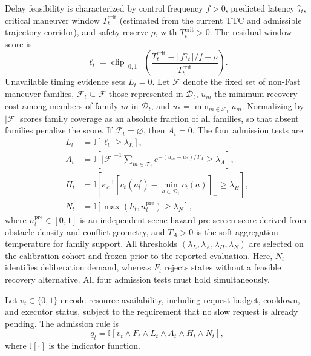 \documentclass[letterpaper,journal]{IEEEtran}
\begin{document}
Delay feasibility is characterized by control frequency $f>0$, predicted latency
$\widehat\tau_t$, critical maneuver window $T_t^{\mathrm{crit}}$ (estimated
from the current TTC and admissible trajectory corridor), and safety reserve
$\rho$, with $T_t^{\mathrm{crit}}>0$. The residual-window score is
\begin{equation}
\ell_t=\operatorname{clip}_{[0,1]}\!\left(
\frac{T_t^{\mathrm{crit}}-\lceil f\widehat\tau_t\rceil/f-\rho}
{T_t^{\mathrm{crit}}}\right).
\label{eq:residual_window}
\end{equation}
Unavailable timing evidence sets $L_t=0$.
Let $\mathcal F$ denote the fixed set of non-Fast maneuver families,
$\mathcal F_t\subseteq\mathcal F$ those represented in $\mathcal D_t$,
$u_m$ the minimum recovery cost among members of family $m$ in $\mathcal D_t$,
and $u_*=\min_{m\in\mathcal F_t}u_m$. Normalizing by $|\mathcal F|$ scores
family coverage as an absolute fraction of all families, so that absent
families penalize the score. If $\mathcal F_t=\varnothing$, then $A_t=0$.
The four admission tests are
\begin{subequations}
\label{eq:admission_tests}
\begin{align}
L_t&=\mathbb{I}[\ell_t\geq\lambda_L],
\label{eq:test_L}\\
A_t&=\mathbb{I}\!\left[|\mathcal F|^{-1}\!\sum_{m\in\mathcal F_t}
e^{-(u_m-u_*)/T_A}\geq\lambda_A\right],
\label{eq:test_A}\\
H_t&=\mathbb{I}\!\left[\kappa_c^{-1}
[c_t(a_t^f)-\min_{a\in\mathcal D_t}c_t(a)]_+\geq\lambda_H\right],
\label{eq:test_H}\\
N_t&=\mathbb{I}[\max(h_t,n_t^{\mathrm{pre}})\geq\lambda_N],
\label{eq:test_N}
\end{align}
\end{subequations}
where $n_t^{\mathrm{pre}}\in[0,1]$ is an independent scene-hazard pre-screen
score derived from obstacle density and conflict geometry, and $T_A>0$ is the
soft-aggregation temperature for family support. All thresholds
$(\lambda_L,\lambda_A,\lambda_H,\lambda_N)$ are selected on the calibration
cohort and frozen prior to the reported evaluation. Here, $N_t$ identifies
deliberation demand, whereas $F_t$ rejects states without a feasible recovery
alternative. All four admission tests must hold simultaneously.

Let $v_t\in\{0,1\}$ encode resource availability, including request budget,
cooldown, and executor status, subject to the requirement that no slow request
is already pending. The admission rule is
\begin{equation}
q_t=\mathbb{I}\!\left[v_t\wedge F_t\wedge L_t\wedge A_t\wedge H_t\wedge N_t\right],
\label{eq:query_admission}
\end{equation}
where $\mathbb{I}[\cdot]$ is the indicator function.
\end{document}
